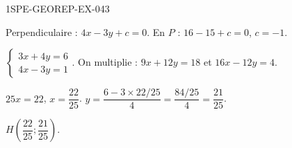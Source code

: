 \begin{corrige}{1SPE-GEOREP-EX-043}


Perpendiculaire : $4x - 3y + c = 0$. En $P$ : $16 - 15 + c = 0$, $c = -1$.

$\begin{cases} 3x + 4y = 6 \\ 4x - 3y = 1 \end{cases}$. On multiplie : $9x + 12y = 18$ et $16x - 12y = 4$.

$25x = 22$, $x = \dfrac{22}{25}$. $y = \dfrac{6 - 3 \times 22/25}{4} = \dfrac{84/25}{4} = \dfrac{21}{25}$.

$H\!\left(\dfrac{22}{25} ; \dfrac{21}{25}\right)$.

\end{corrige}
